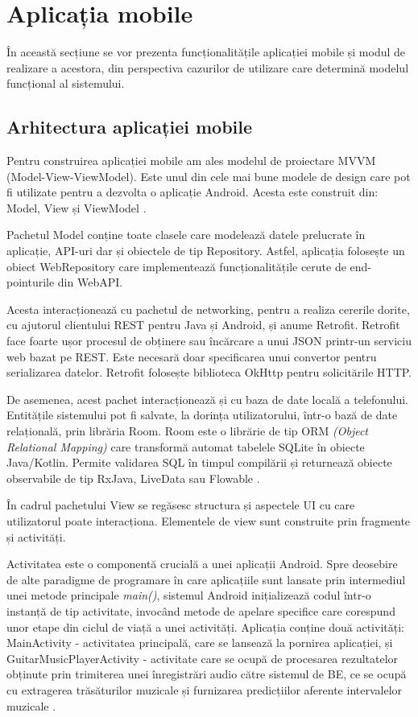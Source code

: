 \documentclass[a4paper,12pt]{report}
\begin{document}
\section{Aplicația mobile}
În această secțiune se vor prezenta funcționalitățile aplicației mobile 
și modul de realizare a acestora, din perspectiva cazurilor de utilizare 
care determină modelul funcțional al sistemului.
\subsection{Arhitectura aplicației mobile}
Pentru construirea aplicației mobile am ales modelul de proiectare 
MVVM (Model-View-ViewModel). Este unul din cele mai bune modele de design 
care pot fi utilizate pentru a dezvolta o aplicație Android. Acesta 
este construit din: Model, View și ViewModel \cite{WEBSITE:android-mvvm}.

Pachetul Model conține toate clasele care modelează datele prelucrate 
în aplicație, API-uri dar și obiectele de tip Repository. Astfel, aplicația 
folosește un obiect WebRepository care implementează funcționalitățile 
cerute de end-pointurile din WebAPI. 

Acesta interacționează cu pachetul 
de networking, pentru a realiza cererile dorite, cu ajutorul 
clientului REST pentru Java și Android, și anume Retrofit. 
Retrofit face foarte ușor procesul de obținere sau încărcare a unui JSON 
printr-un serviciu web bazat pe REST. Este necesară doar specificarea unui 
convertor pentru serializarea datelor. Retrofit folosește biblioteca OkHttp 
pentru solicitările HTTP.

De asemenea, acest pachet interacționează și cu baza de date locală a telefonului. Entitățile 
sistemului pot fi salvate, la dorința utilizatorului, într-o bază de date 
relațională, prin librăria Room. Room este o librărie de tip 
ORM \emph{(Object Relational Mapping)} care transformă automat tabelele SQLite
în obiecte Java/Kotlin. Permite validarea SQL în timpul compilării 
și returnează obiecte observabile de tip RxJava, LiveData sau 
Flowable \cite{WEBSITE:android-room}.

În cadrul pachetului View se regăsesc structura și aspectele UI cu care 
utilizatorul poate interacționa. Elementele de view sunt construite prin 
fragmente și activități. 

Activitatea este o componentă crucială a unei aplicații Android. Spre 
deosebire de alte paradigme de programare în care aplicațiile sunt 
lansate prin intermediul unei metode principale \emph{main()}, sistemul 
Android inițializează codul într-o instanță de tip activitate, invocând 
metode de apelare specifice care corespund unor etape din ciclul de viață
a unei activități. Aplicația conține două activități: MainActivity - 
activitatea principală, care se lansează la pornirea aplicației, și 
GuitarMusicPlayerActivity - activitate care se ocupă de procesarea 
rezultatelor obținute prin trimiterea unei înregistrări audio către 
sistemul de BE, ce se ocupă cu extragerea trăsăturilor muzicale și 
furnizarea predicțiilor aferente intervalelor muzicale \cite{WEBSITE:android-activity}.
\end{document}
